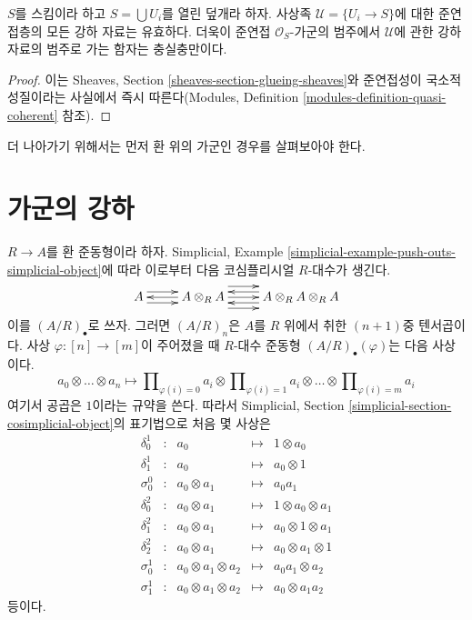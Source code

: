 \begin{lemma}
\label{lemma-zariski-descent-effective}
$S$를 스킴이라 하고 $S = \bigcup U_i$를 열린 덮개라 하자.
사상족 $\mathcal{U} = \{U_i \to S\}$에 대한 준연접층의 모든 강하 자료는
유효하다. 더욱이 준연접 $\mathcal{O}_S$-가군의 범주에서
$\mathcal{U}$에 관한 강하 자료의 범주로 가는 함자는 충실충만이다.
\end{lemma}

\begin{proof}
이는 Sheaves, Section \ref{sheaves-section-glueing-sheaves}와
준연접성이 국소적 성질이라는 사실에서 즉시 따른다(Modules, Definition
\ref{modules-definition-quasi-coherent} 참조).
\end{proof}

\noindent
더 나아가기 위해서는 먼저 환 위의 가군인 경우를 살펴보아야 한다.










\section{가군의 강하}
\label{section-descent-modules}

\noindent
$R \to A$를 환 준동형이라 하자.
Simplicial, Example \ref{simplicial-example-push-outs-simplicial-object}에
따라 이로부터 다음 코심플리시얼 $R$-대수가 생긴다.
$$
\xymatrix{
A
\ar@<1ex>[r]
\ar@<-1ex>[r]
&
A \otimes_R A
\ar@<0ex>[l]
\ar@<2ex>[r]
\ar@<0ex>[r]
\ar@<-2ex>[r]
&
A \otimes_R A \otimes_R A
\ar@<1ex>[l]
\ar@<-1ex>[l]
}
$$
이를 $(A/R)_\bullet$로 쓰자. 그러면 $(A/R)_n$은 $A$를 $R$ 위에서 취한
$(n + 1)$중 텐서곱이다. 사상 $\varphi : [n] \to [m]$이 주어졌을 때
$R$-대수 준동형 $(A/R)_\bullet(\varphi)$는 다음 사상이다.
$$
a_0 \otimes \ldots \otimes a_n
\longmapsto
\prod\nolimits_{\varphi(i) = 0} a_i
\otimes
\prod\nolimits_{\varphi(i) = 1} a_i
\otimes \ldots \otimes
\prod\nolimits_{\varphi(i) = m} a_i
$$
여기서 공곱은 $1$이라는 규약을 쓴다. 따라서 Simplicial, Section
\ref{simplicial-section-cosimplicial-object}의 표기법으로 처음 몇 사상은
$$
\begin{matrix}
\delta^1_0 & : & a_0 & \mapsto & 1 \otimes a_0 \\
\delta^1_1 & : & a_0 & \mapsto & a_0 \otimes 1 \\
\sigma^0_0 & : & a_0 \otimes a_1 & \mapsto & a_0a_1 \\
\delta^2_0 & : & a_0 \otimes a_1 & \mapsto & 1 \otimes a_0 \otimes a_1 \\
\delta^2_1 & : & a_0 \otimes a_1 & \mapsto & a_0 \otimes 1 \otimes a_1 \\
\delta^2_2 & : & a_0 \otimes a_1 & \mapsto & a_0 \otimes a_1 \otimes 1 \\
\sigma^1_0 & : & a_0 \otimes a_1 \otimes a_2 & \mapsto & a_0a_1 \otimes a_2 \\
\sigma^1_1 & : & a_0 \otimes a_1 \otimes a_2 & \mapsto & a_0 \otimes a_1a_2
\end{matrix}
$$
등이다.

